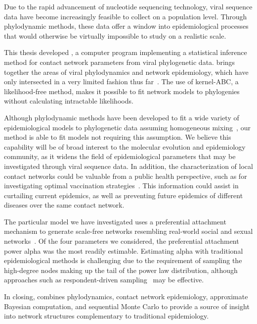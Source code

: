 Due to the rapid advancement of nucleotide sequencing technology, viral
sequence data have become increasingly feasible to collect on a population
level. Through phylodynamic methods, these data offer a window into
epidemiological processes that would otherwise be virtually impossible to study
on a realistic scale. 

This thesis developed , a computer program implementing a
statistical inference method for contact network parameters from viral
phylogenetic data.  brings together the areas of viral
phylodynamics and network epidemiology, which have only intersected in a very
limited fashion thus far~\autocite{welch2011statistical}. The use of
kernel-\gls{ABC}, a likelihood-free method, makes it possible to fit network
models to phylogenies without calculating intractable likelihoods.

Although phylodynamic methods have been developed to fit a wide variety of
epidemiological models to phylogenetic data assuming homogeneous
mixing~\autocite{volz2012complex, rasmussen2014phylodynamic}, our method is
able to fit models not requiring this assumption. We believe this capability
will be of broad interest to the molecular evolution and epidemiology
community, as it widens the field of epidemiological parameters that may be
investigated through viral sequence data. In addition, the characterization of
local contact networks could be valuable from a public health perspective, such
as for investigating optimal vaccination
strategies~\autocite{keeling2005networks, peng2013vaccination,
ma2013importance, rushmore2014network}. This information could assist in
curtailing current epidemics, as well as preventing future epidemics of
different diseases over the same contact network.

The particular model we have investigated uses a preferential attachment
mechanism to generate scale-free networks resembling real-world social and
sexual networks~\autocite{liljeros2001web, schneeberger2004scale,
colgate1989risk}. Of the four parameters we considered, the preferential
attachment power \gls{alpha} was the most readily estimable. Estimating
\gls{alpha} with traditional epidemiological methods is challenging due to the
requirement of sampling the high-degree nodes making up the tail of the power
law distribution, although approaches such as respondent-driven
sampling~\autocite{heckathorn1997respondent}  may be effective.

In closing,  combines phylodynamics, contact network
epidemiology, approximate Bayesian computation, and sequential Monte Carlo 
to provide a source of insight into network structures complementary to
traditional epidemiology.
